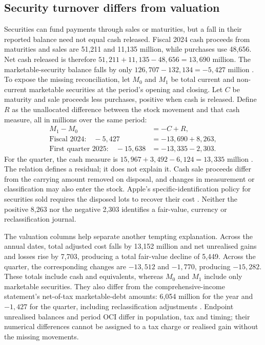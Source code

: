 \subsection{Security turnover differs from valuation}

Securities can fund payments through sales or maturities, but a fall in their
reported balance need not equal cash released. Fiscal 2024 cash proceeds from
maturities and sales are 51,211 and 11,135 million, while purchases use 48,656.
Net cash released is therefore $51{,}211+11{,}135-48{,}656=13{,}690$ million.
The marketable-security balance falls by only
$126{,}707-132{,}134=-5{,}427$ million
\citep[cash-flow statement, printed p.~33, and Note 4]{apple2024}.
To expose the missing reconciliation, let $M_0$ and $M_1$ be total current
and non-current marketable securities at the period's opening and closing.
Let $C$ be maturity and sale proceeds less purchases, positive when cash is
released. Define $R$ as the unallocated difference between the stock movement
and that cash measure, all in millions over the same period:
\[
\begin{aligned}
 M_1-M_0&=-C+R,\\
 \text{Fiscal 2024:}\quad -5{,}427&=-13{,}690+8{,}263,\\
 \text{First quarter 2025:}\quad -15{,}638&=-13{,}335-2{,}303.
\end{aligned}
\]
For the quarter, the cash measure is
$15{,}967+3{,}492-6{,}124=13{,}335$ million
\citep[cash-flow statement and Note 4]{apple2025q1}. The relation defines a
residual; it does not explain it. Cash sale proceeds differ from the carrying
amount removed on disposal, and changes in measurement or classification may
also enter the stock. Apple's specific-identification policy for securities
sold requires the disposed lots to recover their cost
\citep[Note 1, printed p.~34]{apple2024}. Neither the positive
8,263 nor the negative 2,303 identifies a fair-value, currency or
reclassification journal.

The valuation columns help separate another tempting explanation. Across the
annual dates, total adjusted cost falls by 13,152 million and net unrealised
gains and losses rise by 7,703, producing a total fair-value decline of 5,449.
Across the quarter, the corresponding changes are $-13{,}512$ and
$-1{,}770$, producing $-15{,}282$. These totals include cash and equivalents,
whereas $M_0$ and $M_1$ include only marketable securities. They also differ from the
comprehensive-income statement's net-of-tax marketable-debt amounts: 6,054
million for the year and $-1{,}427$ for the quarter, including reclassification
adjustments \citep[comprehensive-income statement, printed p.~30]{apple2024}
\citep[comprehensive-income statement, printed p.~2]{apple2025q1}. Endpoint
unrealised balances and period OCI differ in population, tax and timing;
their numerical differences cannot be assigned to a tax charge or realised
gain without the missing movements.

